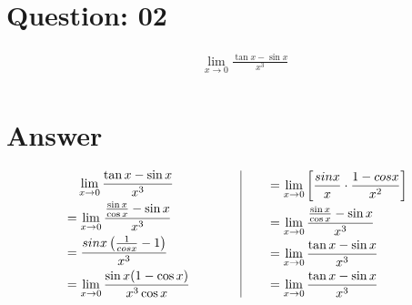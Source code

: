 \documentclass[17pt]{extarticle}
\begin{document}
\begin{fleqn}
\section{Question: 02}

\begin{equation} \nonumber
\begin{alignedat}{4}
& \texttt{\ \ }  \lim_{x \to 0} \frac{\tan{x} - \sin{x}}{x^3}\\
\end{alignedat}
\end{equation}



\section{Answer}

\begin{equation} \nonumber
\begin{alignedat}{4}
& \texttt{\ \ } \lim_{x \to 0} \frac{\tan{x} - \sin{x}}{x^3}\\
&= \lim_{x \to 0} \frac{\frac{\sin{x}}{\cos{x}}-\sin{x}}{x^3}\\
&= \frac{sin x\left(\frac{1}{cos x} - 1\right)}{x^3}\\
&= \lim_{x \to 0} \frac{\sin{x}(1  - \cos{x})}{x^3\cos{x}}\\
\end{alignedat}
\qquad
\qquad
\vrule
\qquad
\begin{alignedat}{4}
&= \lim_{x \to 0}\left[\frac{sin x}{x}\cdot\frac{1 - cos x}{x^2} \right] \\
&= \lim_{x \to 0} \frac{\frac{\sin{x}}{\cos{x}}-\sin{x}}{x^3}\\
&= \lim_{x \to 0} \frac{\tan{x} - \sin{x}}{x^3}\\
&= \lim_{x \to 0} \frac{\tan{x} - \sin{x}}{x^3}\\
\end{alignedat}
\end{equation}



\end{fleqn}
\end{document}
